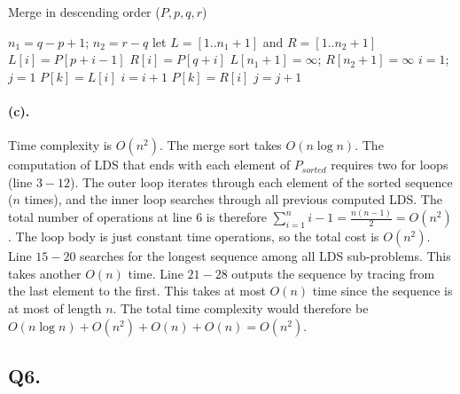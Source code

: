 \documentclass[12pt]{article}
\begin{document}
\begin{algorithm}[H]
     \caption{Merge in descending order (\(P, p, q, r\))}
     \begin{algorithmic}[1]
          \State \(n_1 = q-p+1\); \(n_2 = r-q\)
          \State let \(L=[1 .. n_1 + 1]\) and \(R=[1.. n_2 +1]\)
               \State \(L[i] = P[p+i-1]\) 
          \EndFor
               \State \(R[i] = P[q+i]\) 
          \EndFor
          \State \(L[n_1+1] = \infty\); \(R[n_2+1] = \infty\)
          \State \(i = 1\); \(j = 1\)
                
                    \State \(P[k] = L[i]\)
                    \State \(i = i + 1\)
               \Else 
                    \State \(P[k] = R[i]\)
                    \State \(j = j + 1\)
               \EndIf
          \EndFor
     \end{algorithmic}
\end{algorithm}

\paragraph{(c).} Time complexity is \(O(n^2)\). The merge sort takes \(O(n\log n)\). The computation of LDS that ends with each element of \(P_{sorted}\) requires two for loops (line \(3-12\)). The outer loop iterates through each element of the sorted sequence (\(n\) times), and the inner loop searches through all previous computed LDS. The total number of operations at line \(6\) is therefore \(\sum_{i=1}^n i-1 = \frac{n(n-1)}{2} = O(n^2)\). The loop body is just constant time operations, so the total cost is \(O(n^2)\). Line \(15-20\) searches for the longest sequence among all LDS sub-problems. This takes another \(O(n)\) time. Line \(21-28\) outputs the sequence by tracing from the last element to the first. This takes at most \(O(n)\) time since the sequence is at most of length \(n\). The total time complexity would therefore be \(O(n\log n) + O(n^2) + O(n) + O(n) = O(n^2)\).

\subsection*{Q6.}
\end{document}

